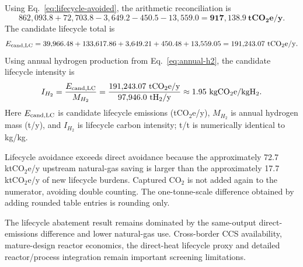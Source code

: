 Using Eq.~\ref{eq:lifecycle-avoided}, the arithmetic reconciliation is
\begin{equation}\label{eq:lifecycle-reconciliation}
862{,}093.8+72{,}703.8-3{,}649.2-450.5-13{,}559.0
=\mathbf{917{,}138.9~tCO_2e/y}.
\end{equation}
The candidate lifecycle total is
\begin{equation}\label{eq:candidate-lifecycle-total}
E_{\rm cand,LC}=39{,}966.48+133{,}617.86+3{,}649.21+450.48+13{,}559.05
=191{,}243.07~\mathrm{tCO_2e/y}.
\end{equation}
Using annual hydrogen production from Eq.~\ref{eq:annual-h2}, the candidate lifecycle intensity is
\begin{equation}\label{eq:lifecycle-intensity}
I_{H_2}=\frac{E_{\rm cand,LC}}{M_{H_2}}
=\frac{191{,}243.07~\mathrm{tCO_2e/y}}{97{,}946.0~\mathrm{tH_2/y}}
\approx1.95~\mathrm{kgCO_2e/kgH_2}.
\end{equation}
Here $E_{\rm cand,LC}$ is candidate lifecycle emissions (tCO$_2$e/y), $M_{H_2}$ is annual hydrogen mass (t/y), and $I_{H_2}$ is lifecycle carbon intensity; t/t is numerically identical to kg/kg.

Lifecycle avoidance exceeds direct avoidance because the approximately 72.7 ktCO$_2$e/y upstream natural-gas saving is larger than the approximately 17.7 ktCO$_2$e/y of new lifecycle burdens. Captured CO$_2$ is not added again to the numerator, avoiding double counting.  The one-tonne-scale difference obtained by adding rounded table entries is rounding only.

The lifecycle abatement result remains dominated by the same-output direct-emissions difference and lower natural-gas use. Cross-border CCS availability, mature-design reactor economics, the direct-heat lifecycle proxy and detailed reactor/process integration remain important screening limitations.
